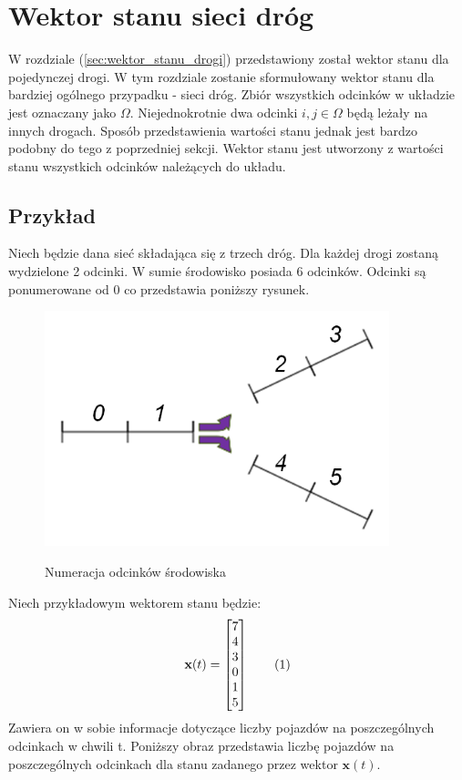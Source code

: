 \documentclass[12pt]{book}
\theoremstyle{plain}
\newcommand\addtag{\refstepcounter{equation}
\renewcommand{\labelenumii}{\theenumii}
\renewcommand{\theenumii}{\theenumi.\arabic{enumii}.}
\tag{\theequation}}
\begin{document}
\section {Wektor stanu sieci dróg}
W rozdziale (\ref{sec:wektor_stanu_drogi}) przedstawiony został wektor stanu dla pojedynczej drogi. W tym rozdziale zostanie sformułowany wektor stanu dla bardziej ogólnego przypadku - sieci dróg. Zbiór wszystkich odcinków w układzie jest oznaczany jako $\Omega$. Niejednokrotnie dwa odcinki $i,j \in \Omega$ będą leżały na innych drogach. Sposób przedstawienia wartości stanu jednak jest bardzo podobny do tego z poprzedniej sekcji. Wektor stanu jest utworzony z wartości stanu wszystkich odcinków należących do układu.
\subsection*{Przykład} \label{subsec:wektor_stanu_siec_przyklad}
Niech będzie dana sieć składająca się z trzech dróg. Dla każdej drogi zostaną wydzielone 2 odcinki. W sumie środowisko posiada 6 odcinków. Odcinki są ponumerowane od 0 co przedstawia poniższy rysunek.
\def \xzero {\begin{bmatrix}
		7 \\ 4 \\ 3 \\ 0 \\ 1 \\ 5
\end{bmatrix}}
	\begin{figure}[H]
	\centering
	\includegraphics[width=10cm]{images/env_11_italic_no_perc}
	\label{fig:env_11}
	\caption{Numeracja odcinków środowiska}
\end{figure}Niech przykładowym wektorem stanu będzie:
\[\textbf{x}(t)=\xzero \addtag \]
Zawiera on w sobie informacje dotyczące liczby pojazdów na poszczególnych odcinkach w chwili t. Poniższy obraz przedstawia liczbę pojazdów na poszczególnych odcinkach dla stanu zadanego przez wektor $\textbf{x}(t)$.
\end{document}
